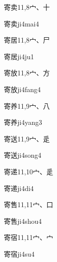 \begin{entry}{寄卖}{11,8}{⼧、⼗}
  \begin{phonetics}{寄卖}{ji4mai4}
  \end{phonetics}
\end{entry}

\begin{entry}{寄居}{11,8}{⼧、⼫}
  \begin{phonetics}{寄居}{ji4ju1}
  \end{phonetics}
\end{entry}

\begin{entry}{寄放}{11,8}{⼧、⽅}
  \begin{phonetics}{寄放}{ji4fang4}
  \end{phonetics}
\end{entry}

\begin{entry}{寄养}{11,9}{⼧、⼋}
  \begin{phonetics}{寄养}{ji4yang3}
  \end{phonetics}
\end{entry}

\begin{entry}{寄送}{11,9}{⼧、⾡}
  \begin{phonetics}{寄送}{ji4song4}
  \end{phonetics}
\end{entry}

\begin{entry}{寄递}{11,10}{⼧、⾡}
  \begin{phonetics}{寄递}{ji4di4}
  \end{phonetics}
\end{entry}

\begin{entry}{寄售}{11,11}{⼧、⼝}
  \begin{phonetics}{寄售}{ji4shou4}
  \end{phonetics}
\end{entry}

\begin{entry}{寄宿}{11,11}{⼧、⼧}
  \begin{phonetics}{寄宿}{ji4su4}
  \end{phonetics}
\end{entry}

